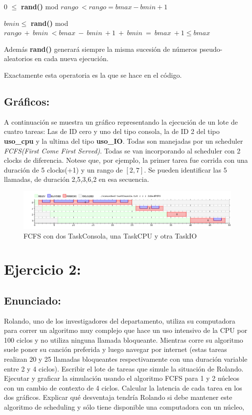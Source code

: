 \documentclass[10pt, a4paper]{article}
\begin{document}
$0$ \hspace{6mm}$\leq$  \hspace{5mm}\textbf{rand()} mod $rango \ < rango = bmax - bmin +1$ 

$bmin\leq$ \hspace{4mm} \textbf{rand()} mod $rango\ + \ bmin \ <  bmax \ - \ bmin \ +1 \ + \ bmin \ = \ bmax \ +1 \leq bmax$

Además \textbf{rand()} generará siempre la misma sucesión de números pseudo-aleatorios en cada nueva ejecución.

Exactamente esta operatoria es la que se hace en el código.
\subsection{Gráficos:}

A continuación se muestra un gráfico representando la ejecución de un lote de cuatro tareas: Las de ID cero y uno  del tipo consola, la de ID 2 del tipo \textbf{uso\_cpu} y la ultima del tipo \textbf{uso\_IO}. Todas son manejadas por un scheduler \textit{FCFS(First Come First Served)}. Todas se van incorporando al scheduler con 2 clocks de diferencia.
Notese que, por ejemplo, la primer tarea fue corrida con una duración de 5 clocks(+1) y un rango de $[2,7]$. Se pueden identificar las 5 llamadas, de duración 2,5,3,6,2 en esa secuencia.
\begin{figure}[H]
  	\centering
   	\includegraphics[width=1\textwidth]
   	 {imgs/ej1.png}
	\caption{FCFS con dos TaskConsola, una TaskCPU y otra TaskIO}
\end{figure}


\section{Ejercicio 2:}

\subsection{Enunciado:}Rolando, uno de los investigadores del departamento, utiliza su computadora
para correr un algoritmo muy complejo que hace un uso intensivo de la CPU por 100 ciclos
y no utiliza ninguna llamada bloqueante. Mientras corre su algoritmo suele poner su canción preferida y luego navegar por internet (estas tareas realizan 20 y 25 llamadas bloqueantes respectivamente con una duración variable entre 2 y 4 ciclos).
Escribir el lote de tareas que simule la situación de Rolando. Ejecutar y graficar la simulación usando el algoritmo FCFS para 1 y 2 núcleos con un cambio de contexto de 4 ciclos. Calcular la latencia de cada tarea en los dos gráficos. Explicar qué desventaja tendría Rolando si debe mantener este algoritmo de scheduling y sólo tiene disponible una computadora con un núcleo, 
\end{document}

